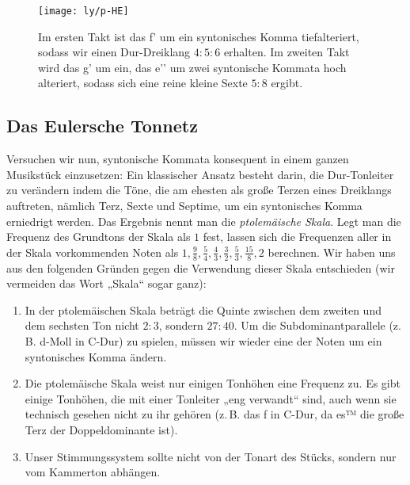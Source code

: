 \begin{figure}\centering
  \texttt{[image: ly/p-HE]}
  \caption{Im ersten Takt ist das \sharp f’ um ein syntonisches Komma 
    tiefalteriert, sodass wir einen Dur-Dreiklang $4:5:6$ erhalten. Im zweiten
    Takt wird das g’ um ein, das \flat e’’ um zwei syntonische Kommata hoch
    alteriert, sodass sich eine reine kleine Sexte $5:8$ ergibt.}\label{fig:HE}
\end{figure}

\subsection{Das Eulersche Tonnetz}

Versuchen wir nun, syntonische Kommata konsequent in einem ganzen Musikstück
einzusetzen: Ein klassischer Ansatz besteht darin, die Dur-Tonleiter zu
verändern indem die Töne, die am ehesten als große Terzen eines Dreiklangs
auftreten, nämlich Terz, Sexte und Septime, um ein syntonisches Komma erniedrigt
werden. Das Ergebnis nennt man die \emph{ptolemäische Skala}. Legt man die
Frequenz des Grundtons der Skala als $1$ fest, lassen sich die Frequenzen aller
in der Skala vorkommenden Noten als 
$1,\frac98,\frac54,\frac43,\frac32,\frac53,\frac{15}8,2$ berechnen. Wir haben
uns aus den folgenden Gründen gegen die Verwendung dieser Skala entschieden
(wir vermeiden das Wort „Skala“ sogar ganz):
\begin{enumerate}
\item In der ptolemäischen Skala beträgt die Quinte zwischen dem zweiten und dem
  sechsten Ton nicht $2:3$, sondern $27:40$. Um die Subdominantparallele
  (z.\,B. d-Moll in C-Dur) zu spielen, müssen wir wieder eine der Noten um ein
  syntonisches Komma ändern.
\item Die ptolemäische Skala weist nur einigen Tonhöhen eine Frequenz zu. Es 
  gibt einige Tonhöhen, die mit einer Tonleiter „eng verwandt“ sind, auch wenn
  sie technisch gesehen nicht zu ihr gehören (z.\,B. das \sharp f in C-Dur, da
  es™ die große Terz der Doppeldominante ist).
\item Unser Stimmungssystem sollte nicht von der Tonart des Stücks, sondern nur
  vom Kammerton abhängen.
\end{enumerate}
